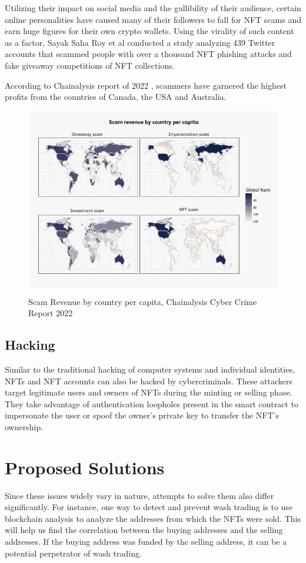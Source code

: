 \documentclass{article}
\begin{document}
Utilizing their impact on social media and the gullibility of their audience, certain online personalities have caused many of their followers to fall for NFT scams and earn huge figures for their own crypto wallets. Using the virality of such content as a factor, Sayak Saha Roy et al \cite{roy2023demystifying} conducted a study analyzing 439 Twitter accounts that scammed people with over a thousand NFT phishing attacks and fake giveaway competitions of NFT collections. 

According to Chainalysis report of 2022 \cite{Chainalysis}, scammers have garnered the highest profits from the countries of Canada, the USA and Australia.

\begin{figure}
    \centering
    \includegraphics[width=12cm]{scam_2022.png}
    \caption{Scam Revenue by country per capita, Chainalysis Cyber Crime Report 2022}
    \label{fig:my_label}
\end{figure}

\subsection{Hacking}
Similar to the traditional hacking of computer systems and individual identities, NFTs and NFT accounts can also be hacked by cybercriminals. These attackers target legitimate users and owners of NFTs during the minting or selling phase. \cite{wang2021non} They take advantage of authentication loopholes present in the smart contract to impersonate the user or spoof the owner’s private key to transfer the NFT’s ownership.

\section{Proposed Solutions}
Since these issues widely vary in nature, attempts to solve them also differ significantly. For instance, one way to detect and prevent wash trading is to use blockchain analysis to analyze the addresses from which the NFTs were sold. This will help us find the correlation between the buying addresses and the selling addresses. If the buying address was funded by the selling address, it can be a potential perpetrator of wash trading.
\end{document}
